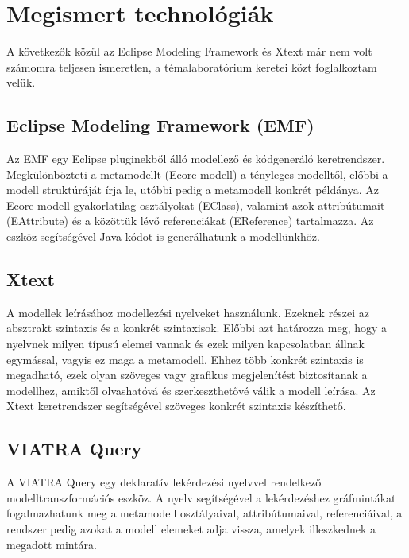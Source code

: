 \chapter{Megismert technológiák}

A következők közül az Eclipse Modeling Framework és Xtext már nem volt számomra teljesen ismeretlen, a témalaboratórium keretei közt foglalkoztam velük.

\section{Eclipse Modeling Framework (EMF)}
Az EMF egy Eclipse pluginekből álló modellező és kódgeneráló keretrendszer. Megkülönbözteti a metamodellt (Ecore modell) a tényleges modelltől, előbbi a modell struktúráját írja le, utóbbi pedig a metamodell konkrét példánya. Az Ecore modell gyakorlatilag osztályokat (EClass), valamint azok attribútumait (EAttribute) és a közöttük lévő referenciákat (EReference) tartalmazza. Az eszköz segítségével Java kódot is generálhatunk a modellünkhöz.

\section{Xtext}
A modellek leírásához modellezési nyelveket használunk. Ezeknek részei az absztrakt szintaxis és a konkrét szintaxisok. Előbbi azt határozza meg, hogy a nyelvnek milyen típusú elemei vannak és ezek milyen kapcsolatban állnak egymással, vagyis ez maga a metamodell. Ehhez több konkrét szintaxis is megadható, ezek olyan szöveges vagy grafikus megjelenítést biztosítanak a modellhez, amiktől olvashatóvá és szerkeszthetővé válik a modell leírása. Az Xtext keretrendszer segítségével szöveges konkrét szintaxis készíthető.

\section{VIATRA Query}
A VIATRA Query egy deklaratív lekérdezési nyelvvel rendelkező modelltranszformációs eszköz. A nyelv segítségével a lekérdezéshez gráfmintákat fogalmazhatunk meg a metamodell osztályaival, attribútumaival, referenciáival, a rendszer pedig azokat a modell elemeket adja vissza, amelyek illeszkednek a megadott mintára.

